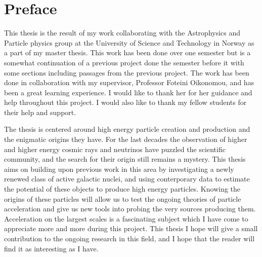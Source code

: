 \section*{Preface}
This thesis is the result of my work collaborating with the  Astrophysics and Particle physics group at the University of Science and Technology in Norway as a part of my master thesis. This work has been done over one semester but is a somewhat continuation of a previous project done the semester before it with some sections including passages from the previous project. The work has been done in collaboration with my supervisor, Professor Foteini Oikonomou, and has been a great learning experience. I would like to thank her for her guidance and help throughout this project. I would also like to thank my fellow students for their help and support.

The thesis is centered around high energy particle creation and production and the enigmatic origins they have. For the last decades the observation of higher and higher energy cosmic rays and neutrinos have puzzled the scientific community, and the search for their origin still remains a mystery. This thesis aims on building upon previous work in this area by investigating a newly renewed class of active galactic nuclei, and using conterporary data to estimate the potential of these objects to produce high energy particles. Knowing the origins of these particles will allow us to test the ongoing theories of particle acceleration and give us new tools into probing the very sources producing them. Acceleration on the largest scales is a fascinating subject which I have come to appreciate more and more during this project. This thesis I hope will give a small contribution to the ongoing research in this field, and I hope that the reader will find it as interesting as I have.
